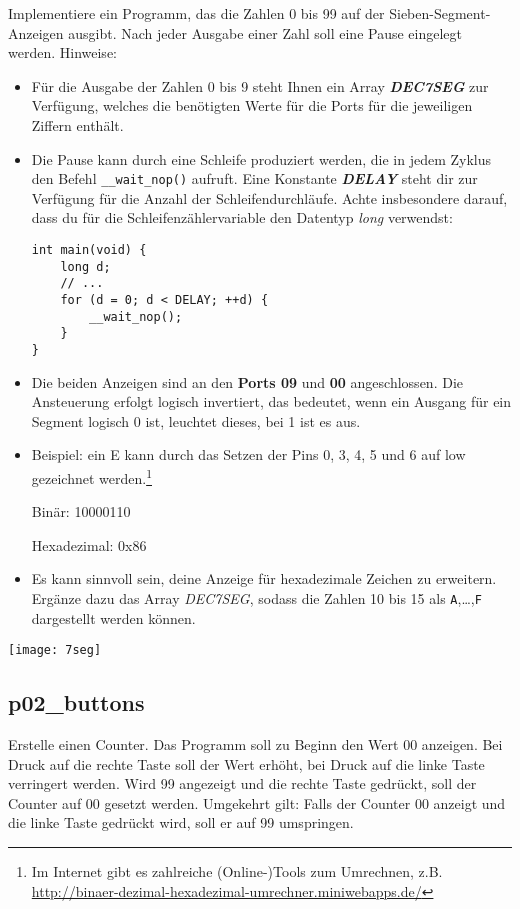 Implementiere ein Programm, das die Zahlen 0 bis 99 auf der Sieben-Segment-Anzeigen ausgibt.
Nach jeder Ausgabe einer Zahl soll eine Pause eingelegt werden.
Hinweise:\begin{itemize}
\item 
Für die Ausgabe der Zahlen 0 bis 9 steht Ihnen ein Array \textbf{\emph{DEC7SEG}} zur Verfügung, welches die benötigten Werte für die Ports für die jeweiligen Ziffern enthält.

\item 
Die Pause kann durch eine Schleife produziert werden, die in jedem Zyklus den Befehl \texttt{\_\_wait\_nop()} aufruft.
Eine Konstante \textbf{\emph{DELAY}} steht dir zur Verfügung für die Anzahl der Schleifendurchläufe.
Achte insbesondere darauf, dass du für die Schleifenzählervariable den Datentyp \emph{long} verwendst:
\begin{lstlisting}
int main(void) {
    long d;
    // ...
    for (d = 0; d < DELAY; ++d) {
        __wait_nop();
    }
}
\end{lstlisting}

\item
Die beiden Anzeigen sind an den \textbf{Ports 09} und \textbf{00} angeschlossen.
Die Ansteuerung erfolgt logisch invertiert, das bedeutet, wenn ein Ausgang für ein Segment logisch 0 ist, leuchtet dieses, bei 1 ist es aus.

\item
Beispiel: ein \glqq{}E\grqq{} kann durch das Setzen der Pins 0, 3, 4, 5 und 6 auf low gezeichnet werden.\footnote{
	Im Internet gibt es zahlreiche (Online-)Tools zum Umrechnen, z.B. 
	\url{http://binaer-dezimal-hexadezimal-umrechner.miniwebapps.de/}
}

\quad Binär: 10000110

\quad Hexadezimal: 0x86

\item
Es kann sinnvoll sein, deine Anzeige für hexadezimale Zeichen zu erweitern.
Ergänze dazu das Array \emph{DEC7SEG}, sodass die Zahlen 10 bis 15 als \texttt{A},\dots,\texttt{F} dargestellt werden können.

\end{itemize}
\begin{center}\texttt{[image: 7seg]}\end{center}

\subsection{p02\_buttons}
Erstelle einen Counter.
Das Programm soll zu Beginn den Wert 00 anzeigen.
Bei Druck auf die rechte Taste soll der Wert erhöht, bei Druck auf die linke Taste verringert werden.
Wird 99 angezeigt und die rechte Taste gedrückt, soll der Counter auf 00 gesetzt werden.
Umgekehrt gilt:
Falls der Counter 00 anzeigt und die linke Taste gedrückt wird, soll er auf 99 umspringen.

